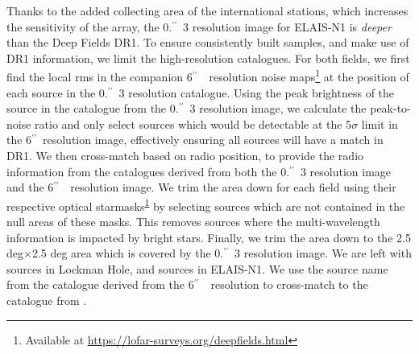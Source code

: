 \documentclass[usenatbib,fleqn,letters]{mnras}
\newcommand{\sarc}{$^{\prime\prime}\!\!$}
\newcommand{\muJybm}{$\mu$Jy$\,$beam$^{-1}$}
\begin{document}

Thanks to the added collecting area of the international stations, which increases the sensitivity of the array, the 0.\sarc\ 3 resolution image for ELAIS-N1 is \textit{deeper} than the Deep Fields DR1. To ensure consistently built samples, and make use of DR1 information, we limit the high-resolution catalogues. For both fields, 
we first find the local rms in the companion 6\sarc\ \ resolution noise maps\footnote{\label{dr1}Available at \href{https://lofar-surveys.org/deepfields.html}{https://lofar-surveys.org/deepfields.html}} at the position of each source in the 0.\sarc\ 3 resolution catalogue. Using the peak brightness of the source in the catalogue from the 0.\sarc\ 3 resolution image, we calculate the peak-to-noise ratio and only select sources which would be detectable at the 5$\sigma$ limit in the 6\sarc\ resolution image, effectively ensuring all sources will have a match in DR1. We then cross-match based on radio position, to provide the radio information from the catalogues derived from both the 0.\sarc\ 3 resolution image and the 6\sarc\ \ resolution image. We trim the area down for each field using their respective optical starmasks\textsuperscript{\ref{dr1}} by selecting sources which are not contained in the null areas of these masks. This removes sources where the multi-wavelength information is impacted by bright stars. Finally, we trim the area down to the 2.5 deg$\times$2.5 deg area which is covered by the 0.\sarc\ 3 resolution image. We are left with sources in Lockman Hole, and sources in ELAIS-N1. We use the source name from the catalogue derived from the 6\sarc\ \ resolution to cross-match to the catalogue from . 
\end{document}
